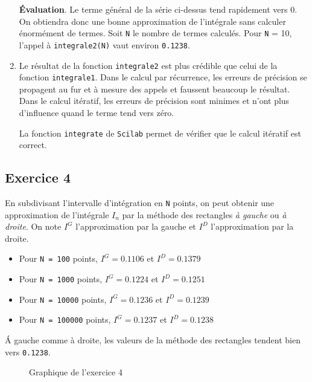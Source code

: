 \documentclass[a4paper,11pt]{article}
\theoremstyle{nonumberplain}
\theoremstyle{nonumberplain}
\theoremstyle{nonumberplain}
\begin{document}
\begin{enumerate}
        \textbf{\'{E}valuation}. Le terme général de la série ci-dessus tend rapidement vers $0$.
        On obtiendra donc une bonne approximation de l'intégrale sans calculer énormément de termes.
        Soit \texttt{N} le nombre de termes calculés. Pour \texttt{N} = 10, l'appel à \texttt{integrale2(N)} vaut environ \texttt{0.1238}.

        \item
        Le résultat de la fonction \texttt{integrale2} est plus crédible que celui de la fonction \texttt{integrale1}.
        Dans le calcul par récurrence, les erreurs de précision se propagent au fur et à mesure des appels et faussent beaucoup le résultat.
        Dans le calcul itératif, les erreurs de précision sont minimes et n'ont plus d'influence quand le terme tend vers zéro.

        La fonction \texttt{integrate} de \texttt{Scilab} permet de vérifier que le calcul itératif est correct.
    \end{enumerate}


\subsection*{Exercice 4}

    En subdivisant l'intervalle d'intégration en \texttt{N} points, on peut obtenir une
    approximation de l'intégrale $I_{n}$ par la méthode des rectangles \textit{à gauche} ou \textit{à droite}.
    On note $I^{G}$ l'approximation par la gauche et $I^{D}$ l'approximation par la droite.

    \begin{itemize}
        \item
        Pour \texttt{N = 100} points, $I^{G} = 0.1106$ et $I^{D} = 0.1379$

        \item
        Pour \texttt{N = 1000} points, $I^{G} = 0.1224$ et $I^{D} = 0.1251$

        \item
        Pour \texttt{N = 10000} points, $I^{G} = 0.1236$ et $I^{D} = 0.1239$

        \item
        Pour \texttt{N = 100000} points, $I^{G} = 0.1237$ et $I^{D} = 0.1238$
    \end{itemize}

    \'{A} gauche comme à droite, les valeurs de la méthode des rectangles tendent bien vers \texttt{0.1238}.
    \begin{figure}[H]
        \centering
        \caption{\label{graph_exo4} Graphique de l'exercice 4}
    \end{figure}
\end{document}
